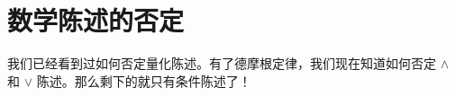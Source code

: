 \section{数学陈述的否定}\label{sec:section4.7}

我们已经看到过如何否定量化陈述。有了德摩根定律，我们现在知道如何否定 $\land$ 和 $\lor$ 陈述。那么剩下的就只有条件陈述了！





